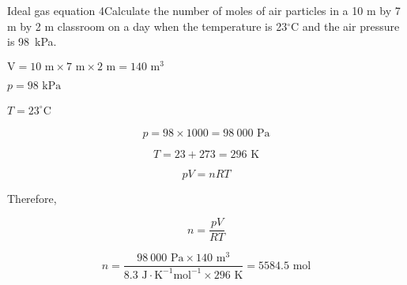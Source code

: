\begin{wex}{Ideal gas equation 4}{Calculate the number of moles of air particles in a 10 m by 7 m by 2 m classroom on a day when the temperature is 23$^\circ$C and the air pressure is 98~kPa.}
{

$\text{V} = 10 \text{ m} \times 7 \text{ m} \times 2 \text{ m} = 140 \text{ m}^{3}$

$p = 98 \text{ kPa}$

$T = 23^{\circ}$C

\begin{equation*}
p = 98 \times 1000 = 98~000 \text{ Pa}
\end{equation*}

\begin{equation*}
T = 23 + 273 = 296 \text{ K}
\end{equation*}

\begin{equation*}
pV = nRT
\end{equation*}

Therefore,

\begin{equation*}
n = \frac{pV}{RT}
\end{equation*}

\begin{equation*}
n = \frac{98~000 \text{ Pa} \times 140 \text{ m}^{3}}{8.3 \text{ J} \cdot \text{K}^{-1} \text{mol}^{-1} \times 296 \text{ K}} = 5584.5 \text{ mol}
\end{equation*}
}
\end{wex}

